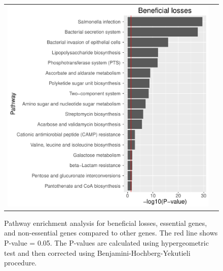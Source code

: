 \documentclass[12pt,letterpaper]{article}
\begin{document}
\begin{figure}
\begin{tabular}{c c}
\includegraphics[scale=0.4]{beneficialloss-pathways.pdf}&
\end{tabular}
\caption{Pathway enrichment analysis for beneficial losses, essential genes, and non-essential genes compared to other genes. The red line shows P-value = 0.05. The P-values are calculated using hypergeometric test and then corrected using Benjamini-Hochberg-Yekutieli procedure.}
\label{fig:essentiality-pathway}
\end{figure}
\end{document}
